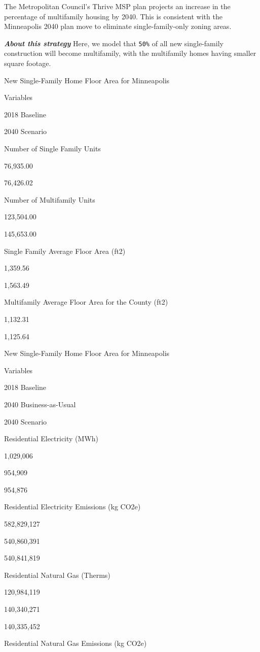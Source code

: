 \documentclass[
]{book}
\begin{document}
The Metropolitan Council's Thrive MSP plan projects an increase in the percentage of multifamily housing by 2040. This is consistent with the Minneapolis 2040 plan move to eliminate single-family-only zoning areas.

\textbf{\emph{About this strategy}} Here, we model that \texttt{50\%} of all new single-family construction will become multifamily, with the multifamily homes having smaller square footage.

\label{tab:tab-increased-multifamily}New Single-Family Home Floor Area for Minneapolis

Variables

2018 Baseline

2040 Scenario

Number of Single Family Units

76,935.00

76,426.02

Number of Multifamily Units

123,504.00

145,653.00

Single Family Average Floor Area (ft2)

1,359.56

1,563.49

Multifamily Average Floor Area for the County (ft2)

1,132.31

1,125.64

\label{tab:fig03a1}New Single-Family Home Floor Area for Minneapolis

Variables

2018 Baseline

2040 Business-as-Usual

2040 Scenario

Residential Electricity (MWh)

1,029,006

954,909

954,876

Residential Electricity Emissions (kg CO2e)

582,829,127

540,860,391

540,841,819

Residential Natural Gas (Therms)

120,984,119

140,340,271

140,335,452

Residential Natural Gas Emissions (kg CO2e)
\end{document}
